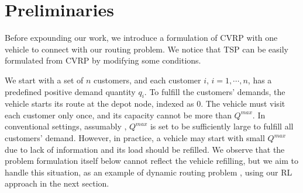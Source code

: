 \documentclass{article}
\begin{document}
\section{Preliminaries}
Before expounding our work, we introduce a formulation of CVRP with one vehicle to connect with our routing problem. We notice that TSP can be easily formulated from CVRP by modifying some conditions.

We start with a set of $n$ customers, and each customer $i$, $i=1, \cdots, n$, has a predefined positive demand quantity $q_i$. To fulfill the customers' demands, the vehicle starts its route at the depot node, indexed as $0$. The vehicle must visit each customer only once, and its capacity cannot be more than $Q^{max}$. In conventional settings, assumably , $Q^{max}$ is set to be sufficiently large to fulfill all customers' demand. However, in practice, a vehicle may start with small $Q^{max}$ due to lack of information and its load should be refilled. We observe that the problem formulation itself below cannot reflect the vehicle refilling, but we aim to handle this situation, as an example of dynamic routing problem \cite{dynamicVRP}, using our RL approach in the next section.
\end{document}
